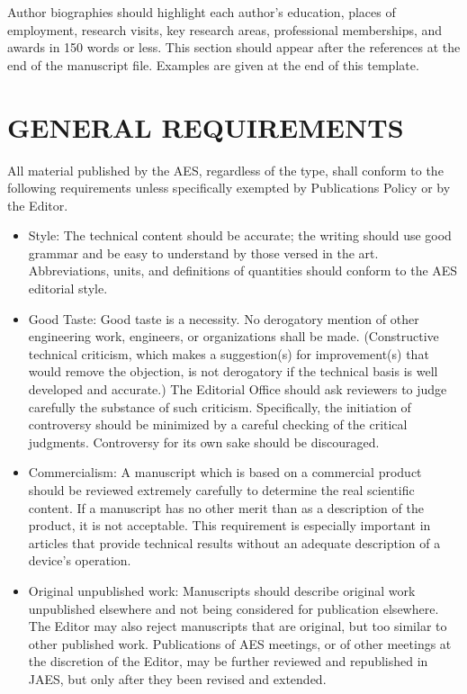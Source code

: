 \documentclass[fleqn]{jaes}
\begin{document}
Author biographies should highlight each author’s education, places of employment, research visits, key research areas, professional memberships, and awards in 150 words or less. This section should appear after the references at the end of the manuscript file. Examples are given at the end of this template.


\section{GENERAL REQUIREMENTS}
All material published by the AES, regardless of the type, shall conform to the following requirements unless specifically exempted by Publications Policy or by the Editor.

\begin{itemize}
    \item Style: The technical content should be accurate; the writing should use good grammar and be easy to understand by those versed in the art. Abbreviations, units, and definitions of quantities should conform to the AES editorial style.
    
    \item Good Taste: Good taste is a necessity. No derogatory mention of other engineering work, engineers, or organizations shall be made. (Constructive technical criticism, which makes a suggestion(s) for improvement(s) that would remove the objection, is not derogatory if the technical basis is well developed and accurate.) The Editorial Office should ask reviewers to judge carefully the substance of such criticism. Specifically, the initiation of controversy should be minimized by a careful checking of the critical judgments. Controversy for its own sake should be discouraged.
    
    \item Commercialism: A manuscript which is based on a commercial product should be reviewed extremely carefully to determine the real scientific content. If a manuscript has no other merit than as a description of the product, it is not acceptable. This requirement is especially important in articles that provide technical results without an adequate description of a device’s operation.
    
    \item Original unpublished work: Manuscripts should describe original work unpublished elsewhere and not being considered for publication elsewhere. The Editor may also reject manuscripts that are original, but too similar to other published work. Publications of AES meetings, or of other meetings at the discretion of the Editor, may be further reviewed and republished in JAES, but only after they been revised and extended.
    

\end{itemize}
\end{document}
